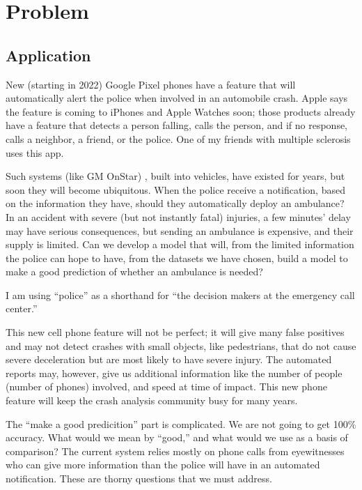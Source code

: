 \section{Problem}

\subsection{Application}


New (starting in 2022) Google Pixel phones have a feature that will automatically alert the police when involved in an automobile crash.  Apple says the feature is coming to iPhones  and Apple Watches soon; those products already have a feature that detects a person falling, calls the person, and if no response, calls a neighbor, a friend, or the police.  One of my friends with multiple sclerosis uses this app.

Such systems (like GM OnStar) , built into vehicles, have existed for years, but soon they will become ubiquitous.  When the police receive a notification, based on the information they have, should they automatically deploy an ambulance?  In an accident with severe (but not instantly fatal) injuries, a few minutes' delay may have serious consequences, but sending an ambulance is expensive, and their supply is limited.  Can we develop a model that will, from the limited information the police can hope to have, from the datasets we have chosen, build a model to make a good prediction of whether an ambulance is needed?  

I am using ``police'' as a shorthand for ``the decision makers at the emergency call center.''  

This new cell phone feature will not be perfect; it will give many false positives and may not detect crashes with small objects, like pedestrians,  that do not cause severe deceleration but are most likely to have severe injury.  The automated reports may, however, give us additional information like the number of people (number of phones) involved, and speed at time of impact.  This new phone feature will keep the crash analysis community busy for many years.  

The ``make a good predicition'' part is complicated.  We are not going to get 100\% accuracy.   What would we mean by ``good,'' and what would we use as a basis of comparison?  The current system relies mostly on phone calls from eyewitnesses who can give more information than the police will have in an automated notification.  These are thorny questions that we must address.  

